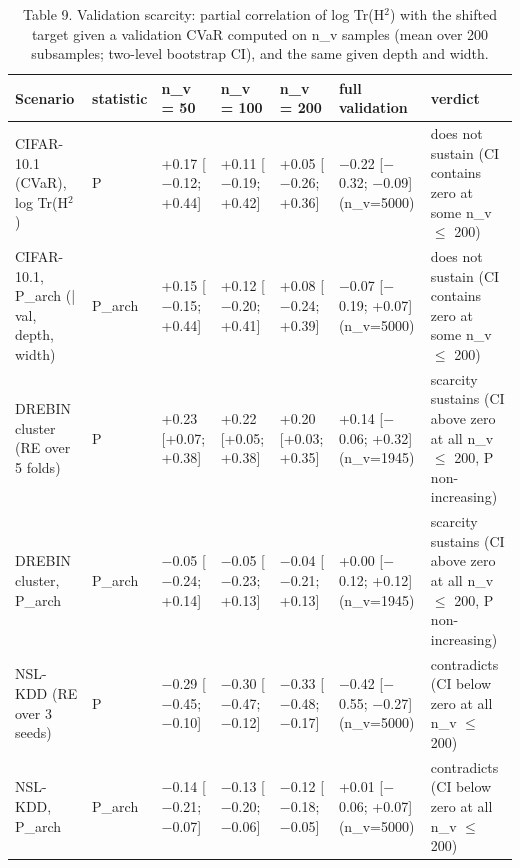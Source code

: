 \begin{table}[t]
\centering\small
\caption{Table 9. Validation scarcity: partial correlation of log Tr(H$^2$) with the shifted target given a validation CVaR computed on n\_v samples (mean over 200 subsamples; two-level bootstrap CI), and the same given depth and width.}
\label{tab:f1}
\begin{tabular}{lllllll}
\toprule
Scenario & statistic & n\_v = 50 & n\_v = 100 & n\_v = 200 & full validation & verdict \\
\midrule
CIFAR-10.1 (CVaR), log Tr(H$^2$) & P & +0.17 [$-$0.12; +0.44] & +0.11 [$-$0.19; +0.42] & +0.05 [$-$0.26; +0.36] & $-$0.22 [$-$0.32; $-$0.09] (n\_v=5000) & does not sustain (CI contains zero at some n\_v $\leq$ 200) \\
CIFAR-10.1, P\_arch (| val, depth, width) & P\_arch & +0.15 [$-$0.15; +0.44] & +0.12 [$-$0.20; +0.41] & +0.08 [$-$0.24; +0.39] & $-$0.07 [$-$0.19; +0.07] (n\_v=5000) & does not sustain (CI contains zero at some n\_v $\leq$ 200) \\
DREBIN cluster (RE over 5 folds) & P & +0.23 [+0.07; +0.38] & +0.22 [+0.05; +0.38] & +0.20 [+0.03; +0.35] & +0.14 [$-$0.06; +0.32] (n\_v=1945) & scarcity sustains (CI above zero at all n\_v $\leq$ 200, P non-increasing) \\
DREBIN cluster, P\_arch & P\_arch & $-$0.05 [$-$0.24; +0.14] & $-$0.05 [$-$0.23; +0.13] & $-$0.04 [$-$0.21; +0.13] & +0.00 [$-$0.12; +0.12] (n\_v=1945) & scarcity sustains (CI above zero at all n\_v $\leq$ 200, P non-increasing) \\
NSL-KDD (RE over 3 seeds) & P & $-$0.29 [$-$0.45; $-$0.10] & $-$0.30 [$-$0.47; $-$0.12] & $-$0.33 [$-$0.48; $-$0.17] & $-$0.42 [$-$0.55; $-$0.27] (n\_v=5000) & contradicts (CI below zero at all n\_v $\leq$ 200) \\
NSL-KDD, P\_arch & P\_arch & $-$0.14 [$-$0.21; $-$0.07] & $-$0.13 [$-$0.20; $-$0.06] & $-$0.12 [$-$0.18; $-$0.05] & +0.01 [$-$0.06; +0.07] (n\_v=5000) & contradicts (CI below zero at all n\_v $\leq$ 200) \\
\bottomrule
\end{tabular}
\end{table}
